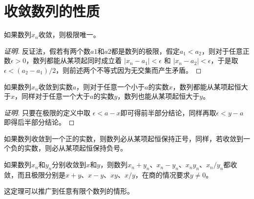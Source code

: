 
\section{收敛数列的性质}
\label{sec:the-properties-of-convergent-sequence.tex}


\begin{theorem}[极限唯一性]
  如果数列$x_n$收敛，则极限唯一。
\end{theorem}

\begin{proof}[证明]
  反证法，假若有两个数$a1$和$a2$都是数列的极限，假定$a_1<a_2$，则对于任意正数$\epsilon > 0$，数列都能从某项起同时成立着 $|x_n-a_1| < \epsilon$ 和 $|x_n-a_2| < \epsilon$，于是取$\epsilon < (a_2-a_1)/2$，则前述两个不等式因为无交集而产生矛盾。
\end{proof}

\begin{theorem}
  如果数列$x_n$收敛到实数$a$，则对于任意一个小于$a$的实数$x$，数列都能从某项起恒大于$x$，同样对于任意一个大于$a$的实数$y$，数列也能从某项起恒大于$y$。
\end{theorem}

\begin{proof}[证明]
  只要在极限的定义中取 $\epsilon < a-x$即可得前半部分结论，同样再取$\epsilon < y-a$即得后半部分结论。
\end{proof}

\begin{inference}[极限的保号性]
  如果数列收敛到一个正的实数，则数列必从某项起恒保持正号，同样，若收敛到一个负的实数，则必从某项起恒保持负号。
\end{inference}


\begin{theorem}
  如果数列$x_n$和$y_n$分别收敛到$x$和$y$，则数列$x_n+y_n$、$x_n-y_n$、$x_ny_n$、$x_n/y_n$都收敛，而且极限分别是$x+y$、$x-y$、$xy$、$x/y$，在商的情况要求$y \neq 0$。
\end{theorem}

这定理可以推广到任意有限个数列的情形。

